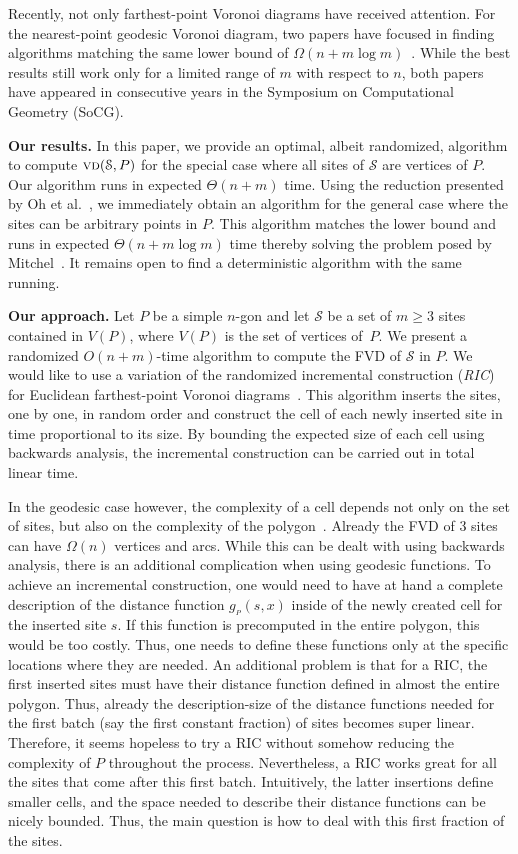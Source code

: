 \documentclass[a4paper,UKenglish]{socg-lipics-v2018}
\newcommand{\s}{\mathcal S}
\newcommand{\g}[3][P]{\ensuremath{g{_{_{#1}}}(#2, #3)}}
\newcommand{\vd}[2][P]{\textsc{vd}(#2, #1)}
\begin{document}
Recently, not only farthest-point Voronoi diagrams have received attention. 
For the nearest-point geodesic Voronoi diagram, two papers have focused in finding algorithms matching the same lower bound of $\Omega(n + m\log m)$~\cite{chihungVoronoi,oh2017voronoi}.
While the best results still work only for a limited range of $m$ with respect to $n$, both papers have appeared in consecutive years in the Symposium on Computational Geometry (SoCG).

\textbf{Our results.} 
In this paper, we provide an optimal, albeit randomized, algorithm to compute $\vd{\s}$ for the special case where all sites of $\s$ are vertices of $P$.
Our algorithm runs in expected $\Theta(n + m)$ time. 
Using the reduction presented by Oh et al.~\cite{oh2016farthest}, we immediately obtain an algorithm for the general case where the sites can be arbitrary points in $P$.
This algorithm matches the lower bound and runs in expected $\Theta(n + m\log m)$ time thereby solving the problem posed by Mitchel~\cite[Chapter 27]{m-gspno-00}.
It remains open to find a deterministic algorithm with the same running.

\textbf{Our approach.}
Let  $P$ be a simple $n$-gon and let $\s$ be a set of $m\geq 3$ sites contained in $V(P)$, where $V(P)$ is the set of vertices of~$P$.
We present a randomized $O(n+m)$-time algorithm to compute the FVD of $\s$ in $P$.
We would like to use a variation of the randomized incremental construction (\emph{RIC}) for Euclidean farthest-point Voronoi diagrams~\cite{de2000computational}.
This algorithm inserts the sites, one by one, in random order and construct the cell of each newly inserted site in time proportional to its size. 
By bounding the expected size of each cell using backwards analysis, the incremental construction can be carried out in total linear time. 

In the geodesic case however, the complexity of a cell depends not only on the set of sites, but also on the complexity of the polygon~\cite{aronov1989geodesic}. 
Already the FVD of 3 sites can have $\Omega(n)$ vertices and arcs.
While this can be dealt with using backwards analysis, there is an additional complication when using geodesic functions.
To achieve an incremental construction, one would need to have at hand a complete description of the distance function $\g{s}{x}$ inside of the newly created cell for the inserted site $s$.
If this function is precomputed in the entire polygon, this would be too costly. 
Thus, one needs to define these functions only at the specific locations where they are needed. 
An additional problem is that for a RIC, the first inserted sites must have their distance function defined in almost the entire polygon.
Thus, already the description-size of the distance functions needed for the first batch (say the first constant fraction) of sites becomes super linear. 
Therefore, it seems hopeless to try a RIC without somehow reducing the complexity of $P$ throughout the process. 
Nevertheless, a RIC works great for all the sites that come after this first batch. 
Intuitively,  the latter insertions define smaller cells, and the space needed to describe their distance functions can be nicely bounded.
Thus, the main question is how to deal with this first fraction of the sites.
\end{document}
